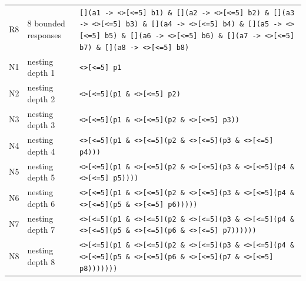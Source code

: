 \begin{table}[t]
\begin{tabular}{@{}llp{}@{}}
R8 & 8 bounded responses & \texttt{[](a1 -\textgreater{} \textless{}\textgreater{}[\textless{}=5] b1) \& [](a2 -\textgreater{} \textless{}\textgreater{}[\textless{}=5] b2) \& [](a3 -\textgreater{} \textless{}\textgreater{}[\textless{}=5] b3) \& [](a4 -\textgreater{} \textless{}\textgreater{}[\textless{}=5] b4) \& [](a5 -\textgreater{} \textless{}\textgreater{}[\textless{}=5] b5) \& [](a6 -\textgreater{} \textless{}\textgreater{}[\textless{}=5] b6) \& [](a7 -\textgreater{} \textless{}\textgreater{}[\textless{}=5] b7) \& [](a8 -\textgreater{} \textless{}\textgreater{}[\textless{}=5] b8)}\\
N1 & nesting depth 1 & \texttt{\textless{}\textgreater{}[\textless{}=5] p1}\\
N2 & nesting depth 2 & \texttt{\textless{}\textgreater{}[\textless{}=5](p1 \& \textless{}\textgreater{}[\textless{}=5] p2)}\\
N3 & nesting depth 3 & \texttt{\textless{}\textgreater{}[\textless{}=5](p1 \& \textless{}\textgreater{}[\textless{}=5](p2 \& \textless{}\textgreater{}[\textless{}=5] p3))}\\
N4 & nesting depth 4 & \texttt{\textless{}\textgreater{}[\textless{}=5](p1 \& \textless{}\textgreater{}[\textless{}=5](p2 \& \textless{}\textgreater{}[\textless{}=5](p3 \& \textless{}\textgreater{}[\textless{}=5] p4)))}\\
N5 & nesting depth 5 & \texttt{\textless{}\textgreater{}[\textless{}=5](p1 \& \textless{}\textgreater{}[\textless{}=5](p2 \& \textless{}\textgreater{}[\textless{}=5](p3 \& \textless{}\textgreater{}[\textless{}=5](p4 \& \textless{}\textgreater{}[\textless{}=5] p5))))}\\
N6 & nesting depth 6 & \texttt{\textless{}\textgreater{}[\textless{}=5](p1 \& \textless{}\textgreater{}[\textless{}=5](p2 \& \textless{}\textgreater{}[\textless{}=5](p3 \& \textless{}\textgreater{}[\textless{}=5](p4 \& \textless{}\textgreater{}[\textless{}=5](p5 \& \textless{}\textgreater{}[\textless{}=5] p6)))))}\\
N7 & nesting depth 7 & \texttt{\textless{}\textgreater{}[\textless{}=5](p1 \& \textless{}\textgreater{}[\textless{}=5](p2 \& \textless{}\textgreater{}[\textless{}=5](p3 \& \textless{}\textgreater{}[\textless{}=5](p4 \& \textless{}\textgreater{}[\textless{}=5](p5 \& \textless{}\textgreater{}[\textless{}=5](p6 \& \textless{}\textgreater{}[\textless{}=5] p7))))))}\\
N8 & nesting depth 8 & \texttt{\textless{}\textgreater{}[\textless{}=5](p1 \& \textless{}\textgreater{}[\textless{}=5](p2 \& \textless{}\textgreater{}[\textless{}=5](p3 \& \textless{}\textgreater{}[\textless{}=5](p4 \& \textless{}\textgreater{}[\textless{}=5](p5 \& \textless{}\textgreater{}[\textless{}=5](p6 \& \textless{}\textgreater{}[\textless{}=5](p7 \& \textless{}\textgreater{}[\textless{}=5] p8)))))))}\\
\bottomrule
\end{tabular}
\end{table}
